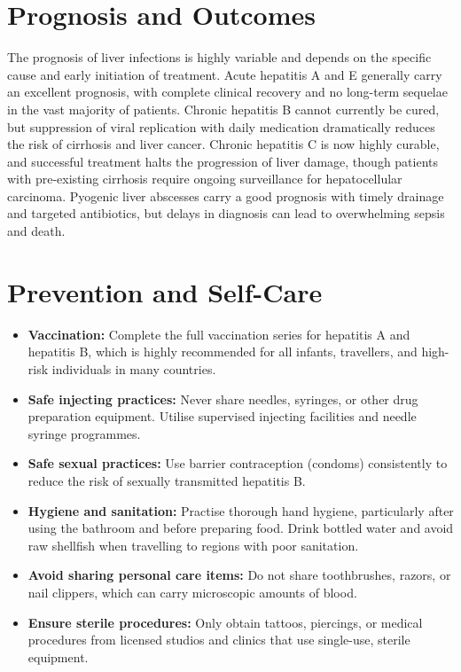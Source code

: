 \section*{Prognosis and Outcomes}
The prognosis of liver infections is highly variable and depends on the specific cause and early initiation of treatment. Acute hepatitis A and E generally carry an excellent prognosis, with complete clinical recovery and no long-term sequelae in the vast majority of patients. Chronic hepatitis B cannot currently be cured, but suppression of viral replication with daily medication dramatically reduces the risk of cirrhosis and liver cancer. Chronic hepatitis C is now highly curable, and successful treatment halts the progression of liver damage, though patients with pre-existing cirrhosis require ongoing surveillance for hepatocellular carcinoma. Pyogenic liver abscesses carry a good prognosis with timely drainage and targeted antibiotics, but delays in diagnosis can lead to overwhelming sepsis and death.

\section*{Prevention and Self-Care}
\begin{itemize}
    \item \textbf{Vaccination:} Complete the full vaccination series for hepatitis A and hepatitis B, which is highly recommended for all infants, travellers, and high-risk individuals in many countries.
    \item \textbf{Safe injecting practices:} Never share needles, syringes, or other drug preparation equipment. Utilise supervised injecting facilities and needle syringe programmes.
    \item \textbf{Safe sexual practices:} Use barrier contraception (condoms) consistently to reduce the risk of sexually transmitted hepatitis B.
    \item \textbf{Hygiene and sanitation:} Practise thorough hand hygiene, particularly after using the bathroom and before preparing food. Drink bottled water and avoid raw shellfish when travelling to regions with poor sanitation.
    \item \textbf{Avoid sharing personal care items:} Do not share toothbrushes, razors, or nail clippers, which can carry microscopic amounts of blood.
    \item \textbf{Ensure sterile procedures:} Only obtain tattoos, piercings, or medical procedures from licensed studios and clinics that use single-use, sterile equipment.
\end{itemize}

